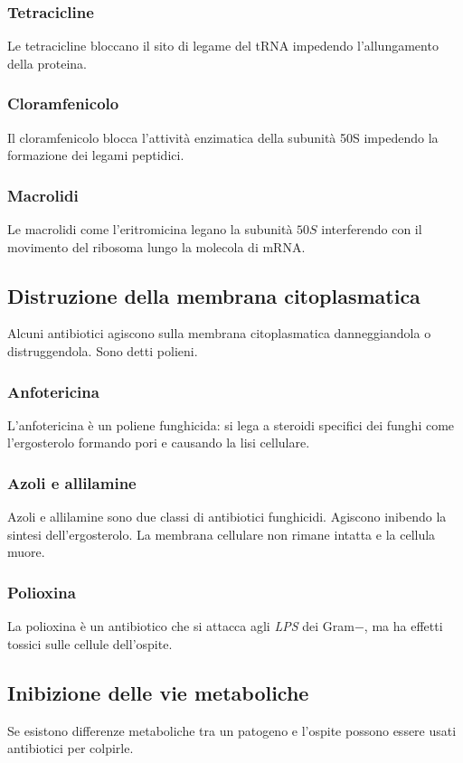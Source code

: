 		\subsubsection{Tetracicline}
		Le tetracicline bloccano il sito di legame del tRNA impedendo l'allungamento della proteina.

		\subsubsection{Cloramfenicolo}
		Il cloramfenicolo blocca l'attività enzimatica della subunità 50S impedendo la formazione dei legami peptidici. 

		\subsubsection{Macrolidi}
		Le macrolidi come l'eritromicina legano la subunità $50S$ interferendo con il movimento del ribosoma lungo la molecola di mRNA. 

	\subsection{Distruzione della membrana citoplasmatica}
	Alcuni antibiotici agiscono sulla membrana citoplasmatica danneggiandola o distruggendola.
	Sono detti polieni.

		\subsubsection{Anfotericina}
		L'anfotericina \`e un poliene funghicida: si lega a steroidi specifici dei funghi come l'ergosterolo formando pori e causando la lisi cellulare.

		\subsubsection{Azoli e allilamine}
		Azoli e allilamine sono due classi di antibiotici funghicidi.
		Agiscono inibendo la sintesi dell'ergosterolo.
		La membrana cellulare non rimane intatta e la cellula muore.

		\subsubsection{Polioxina}
		La polioxina \`e un antibiotico che si attacca agli \emph{LPS} dei Gram$-$, ma ha effetti tossici sulle cellule dell'ospite.

	\subsection{Inibizione delle vie metaboliche}
	Se esistono differenze metaboliche tra un patogeno e l'ospite possono essere usati antibiotici per colpirle.

